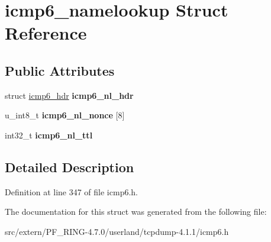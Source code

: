 \hypertarget{structicmp6__namelookup}{
\section{icmp6\_\-namelookup Struct Reference}
\label{structicmp6__namelookup}
}
\subsection*{Public Attributes}
\begin{DoxyCompactItemize}
\item 
\hypertarget{structicmp6__namelookup_a0d15863bbddb6f215e2cbaa092ff6d43}{
struct \hyperlink{structicmp6__hdr}{icmp6\_\-hdr} {\bfseries icmp6\_\-nl\_\-hdr}}
\label{structicmp6__namelookup_a0d15863bbddb6f215e2cbaa092ff6d43}

\item 
\hypertarget{structicmp6__namelookup_acc288367462e1cbddb1eb0e750bd38c6}{
u\_\-int8\_\-t {\bfseries icmp6\_\-nl\_\-nonce} \mbox{[}8\mbox{]}}
\label{structicmp6__namelookup_acc288367462e1cbddb1eb0e750bd38c6}

\item 
\hypertarget{structicmp6__namelookup_ad4dd69d792c8c63ee63e01678bfeb3c8}{
int32\_\-t {\bfseries icmp6\_\-nl\_\-ttl}}
\label{structicmp6__namelookup_ad4dd69d792c8c63ee63e01678bfeb3c8}

\end{DoxyCompactItemize}


\subsection{Detailed Description}


Definition at line 347 of file icmp6.h.



The documentation for this struct was generated from the following file:\begin{DoxyCompactItemize}
\item 
src/extern/PF\_\-RING-\/4.7.0/userland/tcpdump-\/4.1.1/icmp6.h\end{DoxyCompactItemize}
